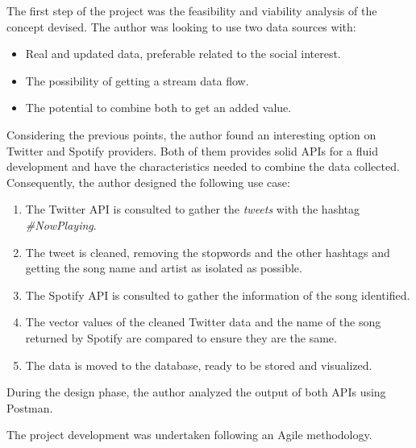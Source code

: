 

\nonzeroparskip The first step of the project was the feasibility and viability analysis of the concept devised. The author was looking to use two data sources with:

\begin{itemize}
	\item Real and updated data, preferable related to the social interest.
	\item The possibility of getting a stream data flow.
	\item The potential to combine both to get an added value.
\end{itemize}

\nonzeroparskip Considering the previous points, the author found an interesting option on Twitter and Spotify providers. Both of them provides solid APIs for a fluid development and have the characteristics needed to combine the data collected. Consequently, the author designed the following use case:

\begin{enumerate}
	\item The Twitter API is consulted to gather the \textit{tweets} with the hashtag \textit{\#NowPlaying}.
	\item The tweet is cleaned, removing the stopwords and the other hashtags and getting the song name and artist as isolated as possible.
	\item The Spotify API is consulted to gather the information of the song identified.
	\item The vector values of the cleaned Twitter data and the name of the song returned by Spotify are compared to ensure they are the same.
	\item The data is moved to the database, ready to be stored and visualized.
\end{enumerate}

\nonzeroparskip During the design phase, the author analyzed the output of both APIs using Postman.


\nonzeroparskip The project development was undertaken following an Agile methodology.\\